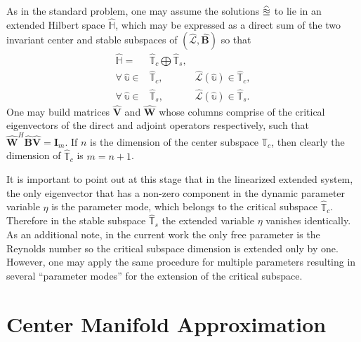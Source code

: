 As in the standard problem, one may assume the solutions $\mathbb{\widehat{u}}$ to lie in an extended Hilbert space $\mathds{\widehat{H}}$, which may be expressed as a direct sum of the two invariant center and stable subspaces of $(\mathcal{\widehat{L}},\mathbf{\widehat{B}})$ so that
\begin{equation}
	\begin{aligned}
		\mathds{\widehat{H}} =& \mathds{\widehat{T}}_{c}\bigoplus \mathds{\widehat{T}}_{s},& \\
		\forall \ \mathbb{\widehat{u}} \in& \mathds{\widehat{T}}_{c}, & \mathcal{\widehat{L}}(\mathbb{\widehat{u}}) \in \mathds{\widehat{T}}_{c}, \\
		\forall \ \mathbb{\widehat{u}} \in& \mathds{\widehat{T}}_{s}, & \mathcal{\widehat{L}}(\mathbb{\widehat{u}}) \in \mathds{\widehat{T}}_{s}. 
	\end{aligned} 
\end{equation}
One may build matrices $\mathbf{\widehat{V}}$ and $\mathbf{\widehat{W}}$ whose columns comprise of the critical eigenvectors of the direct and adjoint operators respectively, such that $\mathbf{\widehat{W}}^{H}\mathbf{\widehat{B}}\mathbf{\widehat{V}} = \mathbf{I}_{m}$. If $n$ is the dimension of the center subspace $\mathds{T}_{c}$, then clearly the dimension of $\mathds{\widehat{T}}_{c}$ is $m = n + 1$.

It is important to point out at this stage that in the linearized extended system, the only eigenvector that has a non-zero component in the dynamic parameter variable $\eta$ is the parameter mode, which belongs to the critical subspace $\mathds{\widehat{T}}_{c}$. Therefore in the stable subspace $\mathds{\widehat{T}}_{s}$ the extended variable $\eta$ vanishes identically. As an additional note, in the current work the only free parameter is the Reynolds number so the critical subspace dimension is extended only by one. However, one may apply the same procedure for multiple parameters resulting in several ``parameter modes'' for the extension of the critical subspace. 

\section{Center Manifold Approximation}
\label{center_manifold_derivation}

